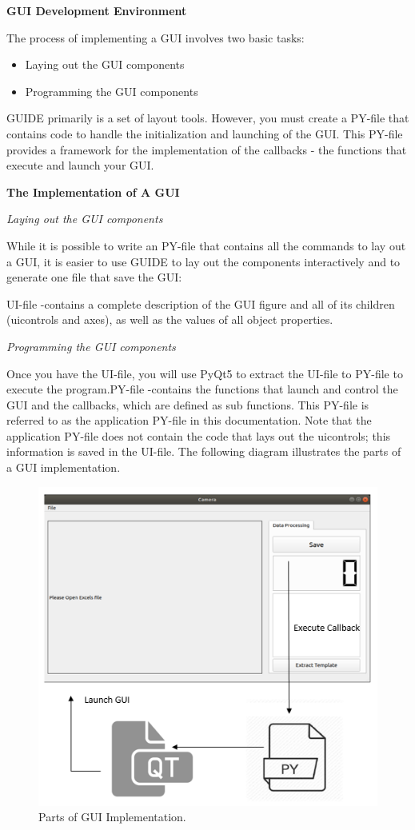 \documentclass[journal, twocolumn]{IEEEtran}
\begin{document}
\textbf{GUI Development Environment}

The process of implementing a GUI involves two basic tasks:
\begin{itemize}
	\item Laying out the GUI components 
	\item Programming the GUI components
\end{itemize}
GUIDE primarily is a set of layout tools. However, you must create a PY-file that contains code to handle the initialization and launching of the GUI. This PY-file provides a framework for the implementation of the callbacks - the functions that execute and launch your GUI. 

\textbf{The Implementation of A GUI}

\textit{Laying out the GUI components}

While it is possible to write an PY-file that contains all the commands to lay out a GUI, it is easier to use GUIDE to lay out the components interactively and to generate one file that save the GUI:

UI-file -contains a complete description of the GUI figure and all of its children (uicontrols and axes), as well as the values of all object properties.

\textit{Programming the GUI components} 

Once you have the UI-file, you will use PyQt5 to extract the UI-file to PY-file to execute the program.PY-file -contains the functions that launch and control the GUI and the callbacks, which are defined as sub functions. This PY-file is referred to as the application PY-file in this documentation. Note that the application PY-file does not contain the code that lays out the uicontrols; this information is saved in the UI-file. The following diagram illustrates the parts of a GUI implementation.

\begin{figure}[!h]
	\centering
	\includegraphics[width=0.8\linewidth]{img/gui.png}
	\caption{Parts of GUI Implementation.}\label{fig:gui}
\end{figure}
\end{document}
